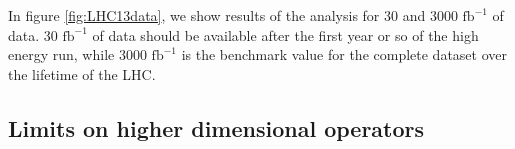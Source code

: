 \documentclass[preprint]{JHEP3} %
\def\invfb {\mathrm{fb}^{-1}}
\begin{document}
In figure \ref{fig:LHC13data}, we show results of the analysis for 30 and 3000 $\invfb$ of data. 30 $\invfb$ of data should be available after 
the first year or so of the high energy run, while 3000 $\invfb$ is the benchmark value for the complete dataset over the lifetime of the LHC. 





\subsection{Limits on higher dimensional operators}
\end{document}
